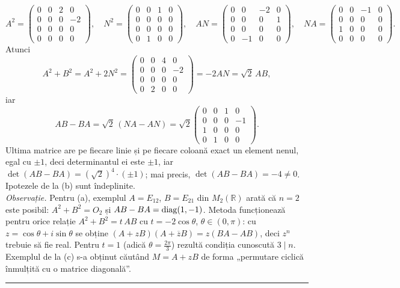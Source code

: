 \[ A^2=\begin{pmatrix}0&0&2&0\\0&0&0&-2\\0&0&0&0\\0&0&0&0\end{pmatrix},\quad N^2=\begin{pmatrix}0&0&1&0\\0&0&0&0\\0&0&0&0\\0&1&0&0\end{pmatrix},\quad AN=\begin{pmatrix}0&0&-2&0\\0&0&0&1\\0&0&0&0\\0&-1&0&0\end{pmatrix},\quad NA=\begin{pmatrix}0&0&-1&0\\0&0&0&0\\1&0&0&0\\0&0&0&0\end{pmatrix}. \]
Atunci
\[ A^2+B^2=A^2+2N^2=\begin{pmatrix}0&0&4&0\\0&0&0&-2\\0&0&0&0\\0&2&0&0\end{pmatrix}=-2AN=\sqrt2\,AB, \]
iar
\[ AB-BA=\sqrt2\,(NA-AN)=\sqrt2\begin{pmatrix}0&0&1&0\\0&0&0&-1\\1&0&0&0\\0&1&0&0\end{pmatrix}. \]
Ultima matrice are pe fiecare linie și pe fiecare coloană exact un element nenul, egal cu $\pm1$, deci determinantul ei este $\pm1$, iar $\det(AB-BA)=(\sqrt2)^4\cdot(\pm1)$; mai precis, $\det(AB-BA)=-4\neq0$. Ipotezele de la (b) sunt îndeplinite.\\[2pt]
\emph{Observație.} Pentru (a), exemplul $A=E_{12}$, $B=E_{21}$ din $M_2(\mathbb{R})$ arată că $n=2$ este posibil: $A^2+B^2=O_2$ și $AB-BA=\operatorname{diag}(1,-1)$. Metoda funcționează pentru orice relație $A^2+B^2=t\,AB$ cu $t=-2\cos\theta$, $\theta\in(0,\pi)$: cu $z=\cos\theta+i\sin\theta$ se obține $(A+zB)(A+\overline{z}B)=z(BA-AB)$, deci $z^n$ trebuie să fie real. Pentru $t=1$ (adică $\theta=\frac{2\pi}{3}$) rezultă condiția cunoscută $3\mid n$. Exemplul de la (c) s-a obținut căutând $M=A+zB$ de forma „permutare ciclică înmulțită cu o matrice diagonală''.
\vspace{1mm}\hrule
